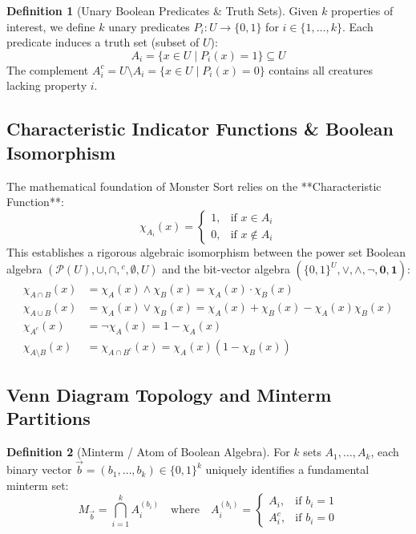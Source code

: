 \documentclass[11pt,a4paper]{article}
\theoremstyle{definition}
\newtheorem{definition}{Definition}
\begin{document}
\begin{definition}[Unary Boolean Predicates \& Truth Sets]
Given $k$ properties of interest, we define $k$ unary predicates $P_i : U \to \{0, 1\}$ for $i \in \{1, \dots, k\}$. Each predicate induces a truth set (subset of $U$):
$$A_i = \{x \in U \mid P_i(x) = 1\} \subseteq U$$
The complement $A_i^c = U \setminus A_i = \{x \in U \mid P_i(x) = 0\}$ contains all creatures lacking property $i$.
\end{definition}

\subsection{Characteristic Indicator Functions \& Boolean Isomorphism}
The mathematical foundation of Monster Sort relies on the **Characteristic Function**:
$$\chi_{A_i}(x) = \begin{cases} 1, & \text{if } x \in A_i \\ 0, & \text{if } x \notin A_i \end{cases}$$
This establishes a rigorous algebraic isomorphism between the power set Boolean algebra $(\mathcal{P}(U), \cup, \cap, {}^c, \emptyset, U)$ and the bit-vector algebra $(\{0, 1\}^U, \lor, \land, \neg, \mathbf{0}, \mathbf{1})$:
\begin{align*}
\chi_{A \cap B}(x) &= \chi_A(x) \land \chi_B(x) = \chi_A(x) \cdot \chi_B(x) \\
\chi_{A \cup B}(x) &= \chi_A(x) \lor \chi_B(x) = \chi_A(x) + \chi_B(x) - \chi_A(x)\chi_B(x) \\
\chi_{A^c}(x) &= \neg \chi_A(x) = 1 - \chi_A(x) \\
\chi_{A \setminus B}(x) &= \chi_{A \cap B^c}(x) = \chi_A(x)(1 - \chi_B(x))
\end{align*}

\subsection{Venn Diagram Topology and Minterm Partitions}
\begin{definition}[Minterm / Atom of Boolean Algebra]
For $k$ sets $A_1, \dots, A_k$, each binary vector $\vec{b} = (b_1, \dots, b_k) \in \{0, 1\}^k$ uniquely identifies a fundamental minterm set:
$$M_{\vec{b}} = \bigcap_{i=1}^k A_i^{(b_i)} \quad \text{where} \quad A_i^{(b_i)} = \begin{cases} A_i, & \text{if } b_i = 1 \\ A_i^c, & \text{if } b_i = 0 \end{cases}$$
\end{definition}
\end{document}
